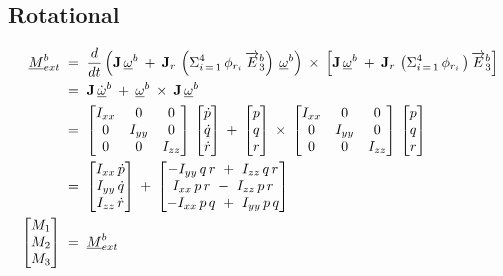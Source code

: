 \subsection{Rotational}
\begin{align*}
\colvec{M}^b_{ext}\;&=\;
	\frac{d}{dt}\left( \mat{J}\,\colvec{\omega}^b\:+\:\mat{J}_r\,\left(\Sigma^4_{i\,=\,1}\,\phi_{r_i}\,\maxis{b}{3}\right)\:\colvec{\omega}^b\right)\:
		\times\:\left[ \mat{J}\,\colvec{\omega}^b\:+\:\mat{J}_r\,\left(\Sigma^4_{i\,=\,1}\,\phi_{r_i}\,\right)\maxis{b}{3}\right]\\
			&=\;\mat{J}\,\colvec{\dot\omega}^b\:+\:\colvec{\omega}^b\:\times\:\mat{J}\,\colvec{\omega}^b\\
			&=\;\begin{bmatrix*}I_{xx} & 0 & 0\\0 & I_{yy} & 0\\0 & 0 & I_{zz}\end{bmatrix*}\,
			\begin{bmatrix*}\dot{p}\\\dot{q}\\\dot{r}\end{bmatrix*}\:+\:
			\begin{bmatrix*}p\\q\\r\end{bmatrix*}\:\times\:
			\begin{bmatrix*}I_{xx} & 0 & 0\\0 & I_{yy} & 0\\0 & 0 & I_{zz}\end{bmatrix*}\,
			\begin{bmatrix*}p\\q\\r\end{bmatrix*}
			\\
			&=\;
			\begin{bmatrix}I_{xx}\,\dot{p}\\I_{yy}\,\dot{q}\\I_{zz}\,\dot{r}\end{bmatrix}\:+\:
			\begin{bmatrix} 
				-I_{yy}\,q\,r~+~I_{zz}\,q\,r\\
				 I_{xx}\,p\,r~-~I_{zz}\,p\,r\\
				-I_{xx}\,p\,q~+~I_{yy}\,p\,q
			\end{bmatrix}\\
			\begin{bmatrix}M_1\\M_2\\M_3\end{bmatrix}
			\;&=\;\colvec{M}^b_{ext}
\end{align*}
